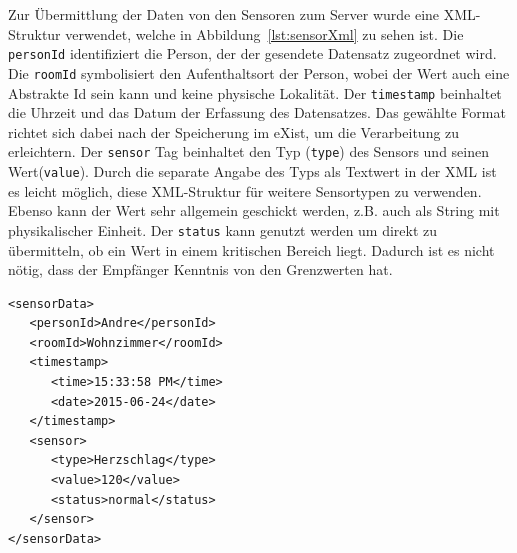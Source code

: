 \newpage
Zur Übermittlung der Daten von den Sensoren zum Server wurde eine XML-Struktur verwendet, welche in Abbildung~\ref{lst:sensorXml} zu sehen ist. Die \texttt{personId} identifiziert die Person, der der gesendete Datensatz zugeordnet wird. Die \texttt{roomId} symbolisiert den Aufenthaltsort der Person, wobei der Wert auch eine Abstrakte Id sein kann und keine physische Lokalität. Der \texttt{timestamp} beinhaltet die Uhrzeit und das Datum der Erfassung des Datensatzes. Das gewählte Format richtet sich dabei nach der Speicherung im eXist, um die Verarbeitung zu erleichtern. Der \texttt{sensor} Tag beinhaltet den Typ (\texttt{type}) des Sensors und seinen Wert(\texttt{value}). Durch die separate Angabe des Typs als Textwert in der XML ist es leicht möglich, diese XML-Struktur für weitere Sensortypen zu verwenden. Ebenso kann der Wert sehr allgemein geschickt werden, z.B. auch als String mit physikalischer Einheit. Der \texttt{status} kann genutzt werden um direkt zu übermitteln, ob ein Wert in einem kritischen Bereich liegt. Dadurch ist es nicht nötig, dass der Empfänger Kenntnis von den Grenzwerten hat.

\begin{lstlisting}[caption={SensorXML},label=lst:sensorXml]
<sensorData>
   <personId>Andre</personId>
   <roomId>Wohnzimmer</roomId>
   <timestamp>
      <time>15:33:58 PM</time>
      <date>2015-06-24</date>
   </timestamp>
   <sensor>
      <type>Herzschlag</type>
      <value>120</value>
      <status>normal</status>
   </sensor>
</sensorData>
\end{lstlisting}